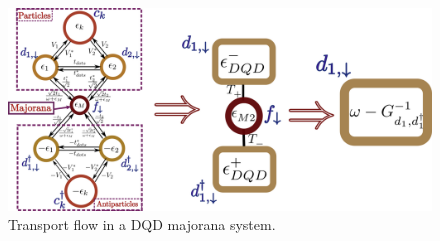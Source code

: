 \documentclass[showpacs,aps,prb,reprint,superscriptaddress]{revtex4-1}
\begin{document}







    \begin{figure}[t]
    \begin{center}
    \centering
     \includegraphics[scale=0.25]{Graficos/graphContractions.png}
    \caption{ Transport flow in a DQD majorana system.   \label{fig:Transport}
    }
    
    \end{center}
    \end{figure}
\end{document}
